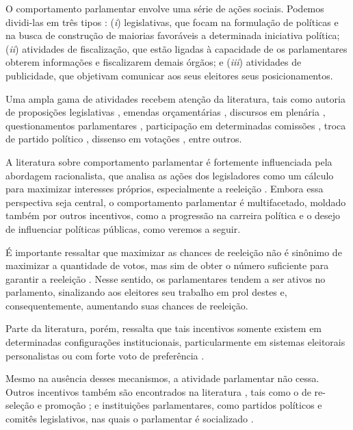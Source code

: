 O comportamento parlamentar envolve uma série de ações sociais. Podemos dividi-las em três tipos \cite{behm_sheep_2019}: (\textit{i}) legislativas, que focam na formulação de políticas e na busca de construção de maiorias favoráveis a determinada iniciativa política; (\textit{ii}) atividades de fiscalização, que estão ligadas à capacidade de os parlamentares obterem informações e fiscalizarem demais órgãos; e (\textit{iii}) atividades de publicidade, que objetivam comunicar aos seus eleitores seus posicionamentos. 

Uma ampla gama de atividades recebem atenção da literatura, tais como autoria de proposições legislativas \cite{crisp2007incentives, gagliarducci2011electoral,mancuso2023business}, emendas orçamentárias \cite{kerevel2015pork}, discursos em plenária  \cite{proksch2012institutional}, questionamentos parlamentares \cite{fernandes2019impact, russo2021mps}, participação em determinadas comissões  \cite{crisp2007incentives,stratmann2002plurality}, troca de partido político \cite{klein2018personal}, dissenso em votações  \cite{carey2007competing, sieberer2010behavioral}, entre outros.

A literatura sobre comportamento parlamentar é fortemente influenciada pela abordagem racionalista, que analisa as ações dos legisladores como um cálculo para maximizar interesses próprios, especialmente a reeleição \cite{mayhew2004congress}. Embora essa perspectiva seja central, o comportamento parlamentar é multifacetado, moldado também por outros incentivos, como a progressão na carreira política e o desejo de influenciar políticas públicas, como veremos a seguir.

É importante ressaltar que maximizar as chances de reeleição não é sinônimo de maximizar a quantidade de votos, mas sim de obter o número suficiente para garantir a reeleição \cite{mayhew2004congress}. Nesse sentido, os parlamentares tendem a ser ativos no parlamento, sinalizando aos eleitores seu trabalho em prol destes e, consequentemente, aumentando suas chances de reeleição.

Parte da literatura, porém, ressalta que tais incentivos somente existem em determinadas configurações institucionais, particularmente em sistemas eleitorais personalistas \cite{aleman2009comparing, kessler1996dynamics, krehbiel1995cosponsors} ou com forte voto de preferência \cite{brauninger2012personal}.

Mesmo na ausência desses mecanismos, a atividade parlamentar não cessa. Outros incentivos também são encontrados na literatura  \cite{strom1997rules}, tais como o de re-seleção e promoção \cite{martin2014electoral, rahat2001candidate,shomer2009candidate};  e instituições parlamentares, como partidos políticos e comitês legislativos, nas quais o parlamentar é socializado \cite{andeweg2011pathways, asher1973learning, louwerse_personalised_2016}.

